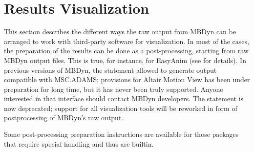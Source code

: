 %
%
%
%
%
% 
%
%

\chapter{Results Visualization}
\label{sec:APP:OUTPUTRESULTS}
This section describes the different ways the raw output from MBDyn
can be arranged to work with third-party software for visualization.
In most of the cases, the preparation of the results can be done 
as a post-processing, starting from raw MBDyn output files.
This is true, for instance, for EasyAnim (see
for details).
In previous versions of MBDyn, the  statement
allowed to generate output compatible with MSC.ADAMS; provisions 
for Altair Motion View has been under preparation for long time,
but it has never been truly supported.
Anyone interested in that interface should contact MBDyn developers.
The  statement is now deprecated;
support for all visualization tools will be reworked
in form of postprocessing of MBDyn's raw output.

\noindent
Some post-processing preparation instructions are available
for those packages that require special handling and thus
are builtin.


